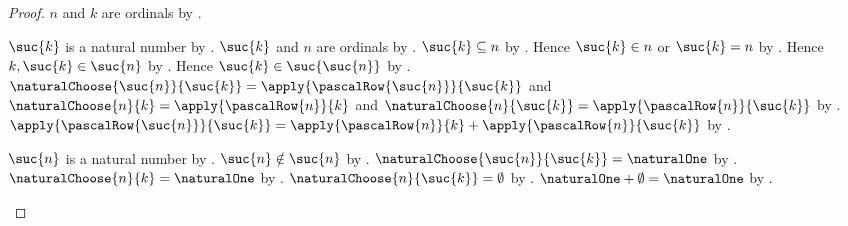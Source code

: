 \begin{proof}
    $n$ and $k$ are ordinals by .
    \begin{byCase}
            $\suc{k}$ is a natural number by .
            $\suc{k}$ and $n$ are ordinals by
                .
            $\suc{k}\subseteq n$ by .
            Hence $\suc{k}\in n$ or $\suc{k}=n$ by
                .
            Hence $k,\suc{k}\in\suc{n}$ by .
            Hence $\suc{k}\in\suc{\suc{n}}$ by .
            $\naturalChoose{\suc{n}}{\suc{k}}
                =\apply{\pascalRow{\suc{n}}}{\suc{k}}$ and
                $\naturalChoose{n}{k}=\apply{\pascalRow{n}}{k}$ and
                $\naturalChoose{n}{\suc{k}}
                    =\apply{\pascalRow{n}}{\suc{k}}$ by
                .
            $\apply{\pascalRow{\suc{n}}}{\suc{k}}
                =\apply{\pascalRow{n}}{k}
                    +\apply{\pascalRow{n}}{\suc{k}}$ by
                .

            \begin{byCase}
                    $\suc{n}$ is a natural number by
                        .
                    $\suc{n}\notin\suc{n}$ by .
                    $\naturalChoose{\suc{n}}{\suc{k}}=\naturalOne$
                        by .
                    $\naturalChoose{n}{k}=\naturalOne$ by
                        .
                    $\naturalChoose{n}{\suc{k}}=\emptyset$ by
                        .
                    $\naturalOne+\emptyset=\naturalOne$ by
                        .


\end{byCase}
\end{byCase}
\end{proof}
